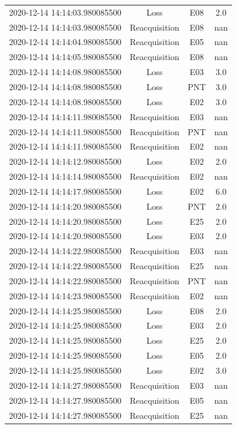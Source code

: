 \begin{enumerate}
\begin{longtabu}{cccc}
2020{-}12{-}14 14:14:03.980085500&Loss&E08&2.0\\%
2020{-}12{-}14 14:14:03.980085500&Reacquisition&E08&nan\\%
2020{-}12{-}14 14:14:04.980085500&Reacquisition&E05&nan\\%
2020{-}12{-}14 14:14:05.980085500&Reacquisition&E08&nan\\%
2020{-}12{-}14 14:14:08.980085500&Loss&E03&3.0\\%
2020{-}12{-}14 14:14:08.980085500&Loss&PNT&3.0\\%
2020{-}12{-}14 14:14:08.980085500&Loss&E02&3.0\\%
2020{-}12{-}14 14:14:11.980085500&Reacquisition&E03&nan\\%
2020{-}12{-}14 14:14:11.980085500&Reacquisition&PNT&nan\\%
2020{-}12{-}14 14:14:11.980085500&Reacquisition&E02&nan\\%
2020{-}12{-}14 14:14:12.980085500&Loss&E02&2.0\\%
2020{-}12{-}14 14:14:14.980085500&Reacquisition&E02&nan\\%
2020{-}12{-}14 14:14:17.980085500&Loss&E02&6.0\\%
2020{-}12{-}14 14:14:20.980085500&Loss&PNT&2.0\\%
2020{-}12{-}14 14:14:20.980085500&Loss&E25&2.0\\%
2020{-}12{-}14 14:14:20.980085500&Loss&E03&2.0\\%
2020{-}12{-}14 14:14:22.980085500&Reacquisition&E03&nan\\%
2020{-}12{-}14 14:14:22.980085500&Reacquisition&E25&nan\\%
2020{-}12{-}14 14:14:22.980085500&Reacquisition&PNT&nan\\%
2020{-}12{-}14 14:14:23.980085500&Reacquisition&E02&nan\\%
2020{-}12{-}14 14:14:25.980085500&Loss&E08&2.0\\%
2020{-}12{-}14 14:14:25.980085500&Loss&E03&2.0\\%
2020{-}12{-}14 14:14:25.980085500&Loss&E25&2.0\\%
2020{-}12{-}14 14:14:25.980085500&Loss&E05&2.0\\%
2020{-}12{-}14 14:14:25.980085500&Loss&E02&3.0\\%
2020{-}12{-}14 14:14:27.980085500&Reacquisition&E03&nan\\%
2020{-}12{-}14 14:14:27.980085500&Reacquisition&E05&nan\\%
2020{-}12{-}14 14:14:27.980085500&Reacquisition&E25&nan\\%

\end{longtabu}
\end{enumerate}
